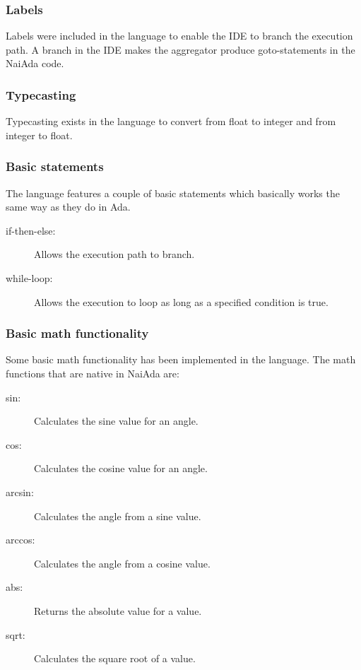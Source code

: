 \subsubsection{Labels}
Labels were included in the language to enable the IDE to branch the execution path. A branch in the IDE makes the aggregator produce goto-statements in the NaiAda code.

\subsubsection{Typecasting}
Typecasting exists in the language to convert from float to integer and from integer to float.

\subsubsection{Basic statements}
The language features a couple of basic statements which basically works the same way as they do in Ada.
\begin{description}
\item[if-then-else:] Allows the execution path to branch.
\item[while-loop:] Allows the execution to loop as long as a specified condition is true.
\end{description}

\subsubsection{Basic math functionality}
Some basic math functionality has been implemented in the language. The math functions that are native in NaiAda are:
\begin{description}
\item[sin:] Calculates the sine value for an angle.
\item[cos:] Calculates the cosine value for an angle.
\item[arcsin:] Calculates the angle from a sine value.
\item[arccos:] Calculates the angle from a cosine value.
\item[abs:] Returns the absolute value for a value.
\item[sqrt:] Calculates the square root of a value.
\end{description}



